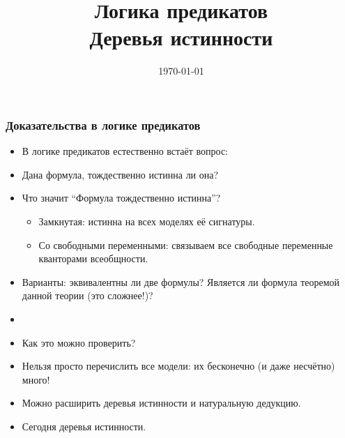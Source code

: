 \documentclass[10pt]{beamer}
\title{Логика предикатов\\Деревья истинности}
\date{\today}
\begin{document}
\begin{frame}[plain]
\maketitle
\end{frame}

\begin{frame}
\frametitle{Доказательства в логике предикатов}
\begin{itemize}
    \item В логике предикатов естественно встаёт вопрос:
    \item Дана формула, тождественно истинна ли она?
    \item Что значит \enquote{Формула тождественно истинна}? \pause 
    \begin{itemize}
        \item Замкнутая: истинна на всех моделях её сигнатуры. \pause
        \item Со свободными переменными: связываем все свободные переменные кванторами всеобщности. \pause
    \end{itemize}
    \item Варианты: эквивалентны ли две формулы? Является ли формула теоремой данной теории (это сложнее!)?
    \item[]
    \item Как это можно проверить?
    \item Нельзя просто перечислить все модели: \pause их бесконечно (и даже несчётно) много!
    \item Можно расширить деревья истинности и натуральную дедукцию. 
    \item Сегодня деревья истинности.
\end{itemize}
\end{frame}
\end{document}
